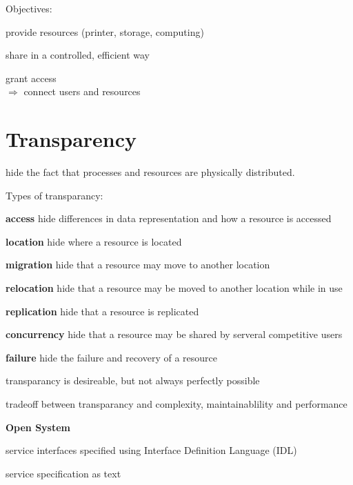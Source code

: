 \documentclass[ngerman,a4paper]{report}
\begin{document}
Objectives:\\
\begin{compactitem}
\item provide resources (printer, storage, computing)
\begin{compactitem}
\item share in a controlled, efficient way
\item grant access\\
$\Rightarrow$ connect users and resources
\end{compactitem}

\end{compactitem}

\section{Transparency}
hide the fact that processes and resources are physically distributed.

Types of transparancy:\\
\begin{compactitem}
\item[\textbf{access}] hide differences in data representation and how a resource is accessed
\item[\textbf{location}] hide where a resource is located
\item[\textbf{migration}] hide that a resource may move to another location
\item[\textbf{relocation}] hide that a resource may be moved to another location while in use
\item[\textbf{replication}] hide that a resource is replicated
\item[\textbf{concurrency}] hide that a resource may be shared by serveral competitive users
\item[\textbf{failure}] hide the failure and recovery of a resource 
\end{compactitem}

transparancy is desireable, but not always perfectly possible

tradeoff between transparancy and complexity, maintainablility and performance

\textbf{Open System}

\begin{compactitem}
\item service interfaces specified using Interface Definition Language (IDL)
\item service specification as text
\end{compactitem}
\end{document}

